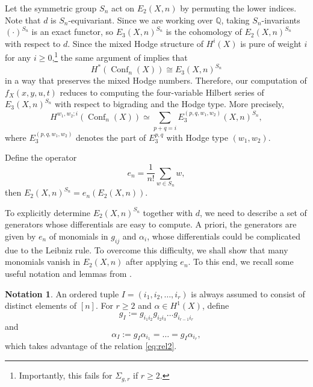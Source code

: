 \documentclass[11pt,reqno]{amsproc}
\numberwithin{equation}{section}
\theoremstyle{definition}
\newtheorem{notation}[theorem]{Notation}
\theoremstyle{remark}
\newcommand\Q{{\mathbb Q}}
\DeclareMathOperator{\Conf}{Conf}
\begin{document}
Let the symmetric group $S_n$ act on $E_2(X,n)$ by permuting the lower indices. Note that $d$ is $S_n$-equivariant. Since we are working over $\Q$, taking $S_n$-invariants $(\cdot)^{S_n}$ is an exact functor, so $E_3(X,n)^{S_n}$ is the cohomology of $E_2(X,n)^{S_n}$ with respect to $d$. Since the mixed Hodge structure of $H^i(X)$ is pure of weight $i$ for any $i\geq 0$,\footnote{Importantly, this fails for $\Sigma_{g,r}$ if $r\geq 2$.} the same argument of \cite[\S 3]{cheonghuang2022betti} implies that
\begin{equation}
H^*(\Conf_n(X))\cong E_3(X,n)^{S_n}
\end{equation}
in a way that preserves the mixed Hodge numbers. Therefore, our computation of $f_X(x,y,u,t)$ reduces to computing the four-variable Hilbert series of $E_3(X,n)^{S_n}$ with respect to bigrading and the Hodge type. More precisely,
\begin{equation}\label{eq:precise}
    H^{w_1,w_2;i}(\Conf_n(X))\simeq \sum_{p+q=i} E_3^{(p,q,w_1,w_2)}(X,n)^{S_n},
\end{equation}
where $E_3^{(p,q,w_1,w_2)}$ denotes the part of $E_3^{p,q}$ with Hodge type $(w_1,w_2)$. 

Define the operator
\begin{equation}
e_n=\frac{1}{n!}\sum_{w\in S_n} w,
\end{equation}
then $E_2(X,n)^{S_n}=e_n(E_2(X,n))$. 

To explicitly determine $E_2(X,n)^{S_n}$ together with $d$, we need to describe a set of generators whose differentials are easy to compute. A priori, the generators are given by $e_n$ of monomials in $g_{ij}$ and $\alpha_i$, whose differentials could be complicated due to the Leibniz rule. To overcome this difficulty, we shall show that many monomials vanish in $E_2(X,n)$ after applying $e_n$. To this end, we recall some useful notation and lemmas from \cite{cheonghuang2022betti}.

\begin{notation}
An ordered tuple $I=(i_1,i_2,\dots,i_r)$ is always assumed to consist of distinct elements of $[n]$. For $r\geq 2$ and $\alpha\in H^1(X)$, define
\begin{equation}
g_I:=g_{i_1i_2} g_{i_2i_3}\dots g_{i_{r-1}i_r}
\end{equation}
and
\begin{equation}
\alpha_I:=g_I \alpha_{i_1}=\dots=g_I \alpha_{i_r},
\end{equation}
which takes advantage of the relation \eqref{eq:rel2}.
\end{notation}
\end{document}
